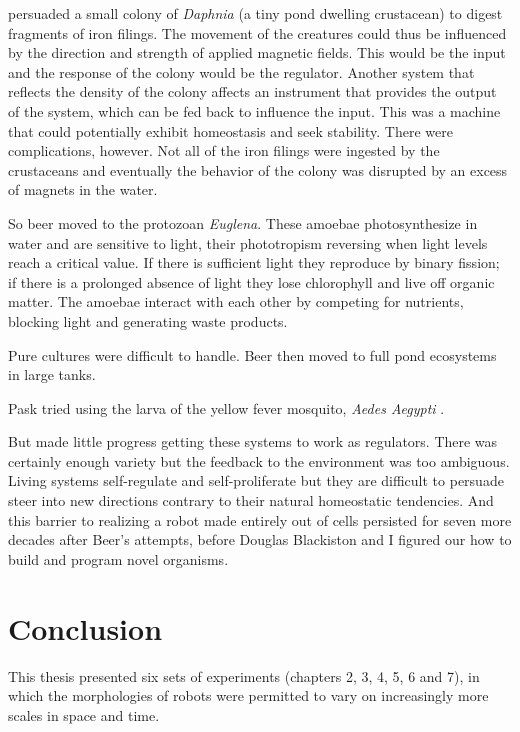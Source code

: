 \citet{beer1962progress}
persuaded a small colony of \textit{Daphnia} (a tiny pond dwelling crustacean) to digest fragments of iron filings.
The movement of the creatures could thus be influenced by 
the direction and strength of applied magnetic fields.
This would be the input and the response of the colony would be the regulator.
Another system that reflects the density of the colony affects an instrument that provides the output of the system, which can be fed back to influence the input.
This was a machine that could potentially exhibit homeostasis and seek stability.
There were complications, however.
Not all of the iron filings were ingested by the crustaceans and eventually the behavior of the colony was disrupted by an excess of magnets in the water.

So beer moved to the protozoan \textit{Euglena}.
These amoebae photosynthesize in water and are sensitive to light, their
phototropism reversing when light levels reach a critical value. 
If there is sufficient light they reproduce by binary fission; if there is a prolonged absence of light they lose chlorophyll and live off organic matter. 
The amoebae interact with each other by competing for nutrients, blocking light and generating waste products.

Pure cultures were difficult to handle.
Beer then moved to full pond ecosystems in large tanks.

Pask tried using the larva of the yellow fever mosquito, \textit{Aedes Aegypti} \cite{beer1962progress}.

But made little progress getting these systems to work as regulators.
There was certainly enough variety but the feedback to the environment was too ambiguous.
Living systems self-regulate and self-proliferate but they are difficult to persuade steer into new directions contrary to their natural homeostatic tendencies.
And this barrier to realizing a robot made entirely out of cells persisted for seven more decades after Beer's attempts, before Douglas Blackiston and I figured our how to build and program novel organisms.




\section{Conclusion}

This thesis presented six sets of experiments (chapters 2, 3, 4, 5, 6 and 7), in which the morphologies of robots were permitted to vary on increasingly more scales in space and time.

